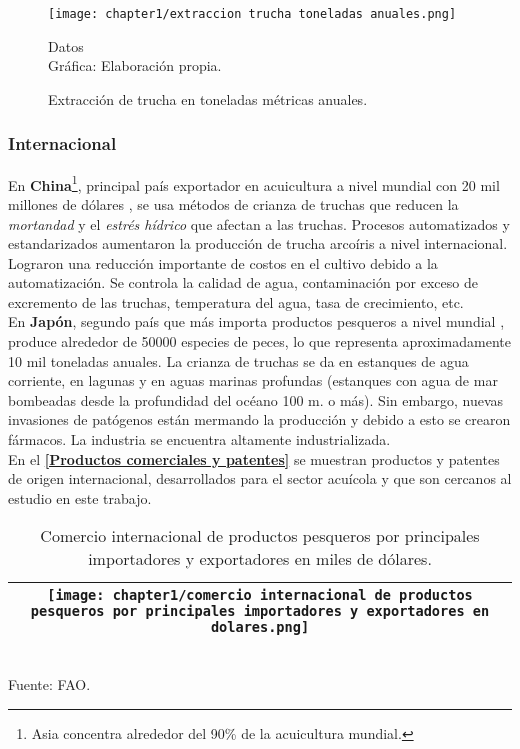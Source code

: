 \begin{figure}[H]
	\centering
	\texttt{[image: chapter1/extraccion trucha toneladas anuales.png]}
	\caption{Extracción de trucha en toneladas métricas anuales.}
	 Datos \cite{MinisteriodelaProducciondelPeru2018}\\
	  Gráfica: Elaboración propia.
	\label{fig:Extracción de trucha en toneladas métricas anuales}
\end{figure}

\subsubsection{Internacional}

En \textbf{China}\footnote{Asia concentra alrededor del 90\% de la acuicultura mundial.\cite{Powell2003}}, principal país exportador en acuicultura a nivel mundial con 20 mil millones de dólares \cite[p.~44]{FAO2017}, se usa métodos de crianza de truchas que reducen la \textit{mortandad} y el \textit{estrés hídrico} que afectan a las truchas. Procesos automatizados y estandarizados aumentaron la producción de trucha arcoíris a nivel internacional. Lograron una reducción importante de costos en el cultivo debido a la automatización. Se controla la calidad de agua, contaminación por exceso de excremento de las truchas, temperatura del agua, tasa de crecimiento, etc. \cite[p.~1-6]{2017}\\
En \textbf{Japón}, segundo país que más importa productos pesqueros a nivel mundial \cite[p.~44]{FAO2017}, produce alrededor de 50000 especies de peces, lo que representa aproximadamente 10 mil toneladas anuales. La crianza de truchas se da en estanques de agua corriente, en lagunas y en aguas marinas profundas (estanques con agua de mar bombeadas desde la profundidad del océano 100 m. o más). Sin embargo, nuevas invasiones de patógenos están mermando la producción y debido a esto se crearon fármacos. La industria se encuentra altamente industrializada. \cite[p.~1-5]{2005} \\

En el \textbf{\ref{Productos comerciales y patentes}} se muestran productos y patentes de origen internacional, desarrollados para el sector acuícola y que son cercanos al estudio en este trabajo.

\begin{table}[H]
	\centering	
	\caption{Comercio internacional de productos pesqueros por principales importadores y exportadores en miles de dólares.}
	\label{tbl:comercio internacional de productos pesqueros por principales importadores y exportadores en dolares}
	\begin{tabular}{ | c | }
		\hline
		\begin{minipage}{1\textwidth}
			\texttt{[image: chapter1/comercio internacional de productos pesqueros por principales importadores y exportadores en dolares.png]}
		\end{minipage}		
		\\ \hline
	\end{tabular}
	\\	Fuente: FAO.
\end{table}

